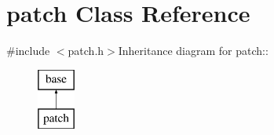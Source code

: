 \hypertarget{classpatch}{
\section{patch Class Reference}
\label{classpatch}
}


{\ttfamily \#include $<$patch.h$>$}Inheritance diagram for patch::\begin{figure}[H]
\begin{center}
\leavevmode
\includegraphics[height=2cm]{classpatch}
\end{center}
\end{figure}
